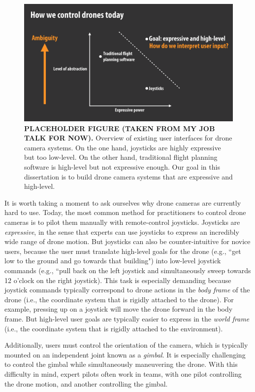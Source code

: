 \begin{figure}[th!]
\centering
\includegraphics[width=5.0in]{images/2018_introduction/intro.png}
\caption{
\textbf{PLACEHOLDER FIGURE (TAKEN FROM MY JOB TALK FOR NOW).}
Overview of existing user interfaces for drone camera systems.
On the one hand, joysticks are highly expressive but too low-level.
On the other hand, traditional flight planning software is high-level but not expressive enough.
Our goal in this dissertation is to build drone camera systems that are expressive and high-level.
}
\label{fig:intro}
\end{figure}

It is worth taking a moment to ask ourselves why drone cameras are currently hard to use.
Today, the most common method for practitioners to control drone cameras is to pilot them manually with remote-control joysticks.
Joysticks are \emph{expressive}, in the sense that experts can use joysticks to express an incredibly wide range of drone motion.
But joysticks can also be counter-intuitive for novice users, because the user must translate high-level goals for the drone (e.g., ``get low to the ground and go towards that building") into low-level joystick commands (e.g., ``pull back on the left joystick and simultaneously sweep towards 12 o'clock on the right joystick).
This task is especially demanding because joystick commands typically correspond to drone actions in the \emph{body frame} of the drone (i.e., the coordinate system that is rigidly attached to the drone). 
For example, pressing up on a joystick will move the drone forward in the body frame.
But high-level user goals are typically easier to express in the \emph{world frame} (i.e., the coordinate system that is rigidly attached to the environment).

Additionally, users must control the orientation of the camera, which is typically mounted on an independent joint known as a \emph{gimbal}.
It is especially challenging to control the gimbal while simultaneously maneuvering the drone.
With this difficulty in mind, expert pilots often work in teams, with one pilot controlling the drone motion, and another controlling the gimbal.

